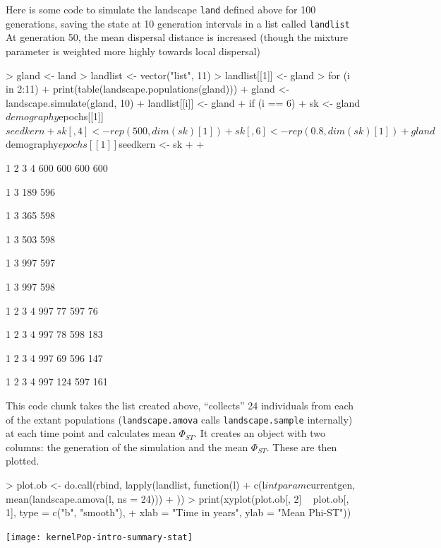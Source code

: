 \documentclass[10pt]{article}
\newcommand{\code}[1]{\texttt{#1}}
\begin{document}
Here is some code to simulate the landscape \code{land} defined above
for 100 generations, saving the state at 10 generation intervals in a
list called \code{landlist} At generation 50, the mean dispersal
distance is increased (though the mixture parameter is weighted more
highly towards local dispersal)

\begin{Schunk}
\begin{Sinput}
> gland <- land
> landlist <- vector("list", 11)
> landlist[[1]] <- gland
> for (i in 2:11) {
+     print(table(landscape.populations(gland)))
+     gland <- landscape.simulate(gland, 10)
+     landlist[[i]] <- gland
+     if (i == 6) {
+         sk <- gland$demography$epochs[[1]]$seedkern
+         sk[, 4] <- rep(500, dim(sk)[1])
+         sk[, 6] <- rep(0.8, dim(sk)[1])
+         gland$demography$epochs[[1]]$seedkern <- sk
+     }
+ }
\end{Sinput}
\begin{Soutput}
  1   2   3   4 
600 600 600 600 

  1   3 
189 596 

  1   3 
365 598 

  1   3 
503 598 

  1   3 
997 597 

  1   3 
997 598 

  1   2   3   4 
997  77 597  76 

  1   2   3   4 
997  78 598 183 

  1   2   3   4 
997  69 596 147 

  1   2   3   4 
997 124 597 161 
\end{Soutput}
\end{Schunk}

This code chunk takes the list created above, ``collects'' 24
individuals from each of the extant populations
(\code{landscape.amova} calls \code{landscape.sample} internally) at
each time point and calculates mean $\Phi_{ST}$.  It creates an object
with two columns: the generation of the simulation and the mean
$\Phi_{ST}$.  These are then plotted.

\begin{Schunk}
\begin{Sinput}
> plot.ob <- do.call(rbind, lapply(landlist, function(l) {
+     c(l$intparam$currentgen, mean(landscape.amova(l, ns = 24)))
+ }))
> print(xyplot(plot.ob[, 2] ~ plot.ob[, 1], type = c("b", "smooth"), 
+     xlab = "Time in years", ylab = "Mean Phi-ST"))
\end{Sinput}
\end{Schunk}
\texttt{[image: kernelPop-intro-summary-stat]}
\end{document}
